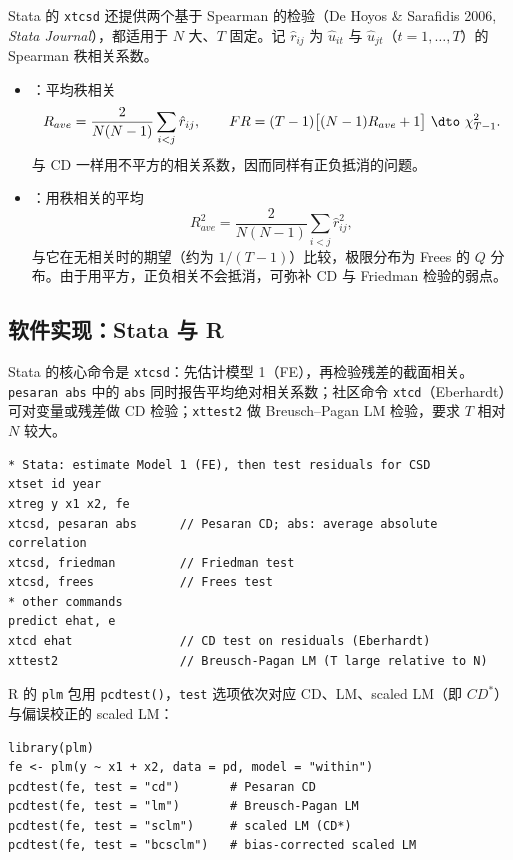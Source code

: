 Stata 的 \texttt{xtcsd} 还提供两个基于 Spearman  的检验（De Hoyos \& Sarafidis 2006, \textit{Stata Journal}），都适用于 $N$ 大、$T$ 固定。记 $\hat r_{ij}$ 为 $\hat u_{it}$ 与 $\hat u_{jt}$（$t=1,\dots,T$）的 Spearman 秩相关系数。
\begin{itemize}
  \item {}：平均秩相关
  \[
  R_{ave}=\frac2{N(N-1)}\sum_{i<j}\hat r_{ij},\qquad FR=(T-1)\big[(N-1)R_{ave}+1\big]\ \dto\ \chi^2_{T-1}.
  \]
  与 CD 一样用不平方的相关系数，因而同样有正负抵消的问题。
  \item {}：用秩相关的平均
  \[
  R_{ave}^2=\frac2{N(N-1)}\sum_{i<j}\hat r_{ij}^2,
  \]
  与它在无相关时的期望（约为 $1/(T-1)$）比较，极限分布为 Frees 的 $Q$ 分布。由于用平方，正负相关不会抵消，可弥补 CD 与 Friedman 检验的弱点。
\end{itemize}

\subsection{软件实现：Stata 与 R}

Stata 的核心命令是 \texttt{xtcsd}：先估计模型 1（FE），再检验残差的截面相关。\texttt{pesaran abs} 中的 \texttt{abs} 同时报告平均绝对相关系数；社区命令 \texttt{xtcd}（Eberhardt）可对变量或残差做 CD 检验；\texttt{xttest2} 做 Breusch--Pagan LM 检验，要求 $T$ 相对 $N$ 较大。
\begin{lstlisting}
* Stata: estimate Model 1 (FE), then test residuals for CSD
xtset id year
xtreg y x1 x2, fe
xtcsd, pesaran abs      // Pesaran CD; abs: average absolute correlation
xtcsd, friedman         // Friedman test
xtcsd, frees            // Frees test
* other commands
predict ehat, e
xtcd ehat               // CD test on residuals (Eberhardt)
xttest2                 // Breusch-Pagan LM (T large relative to N)
\end{lstlisting}
R 的 \texttt{plm} 包用 \texttt{pcdtest()}，\texttt{test} 选项依次对应 CD、LM、scaled LM（即 $CD^*$）与偏误校正的 scaled LM：
\begin{lstlisting}
library(plm)
fe <- plm(y ~ x1 + x2, data = pd, model = "within")
pcdtest(fe, test = "cd")       # Pesaran CD
pcdtest(fe, test = "lm")       # Breusch-Pagan LM
pcdtest(fe, test = "sclm")     # scaled LM (CD*)
pcdtest(fe, test = "bcsclm")   # bias-corrected scaled LM
\end{lstlisting}

